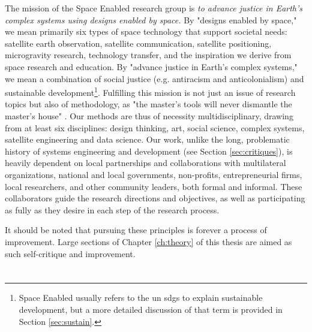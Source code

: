The mission of the Space Enabled research group is \textit{to advance justice in Earth's complex systems using designs enabled by space.} By "designs enabled by space," we mean primarily six types of space technology that support societal needs: satellite earth observation, satellite communication, satellite positioning, microgravity research, technology transfer, and the inspiration we derive from space research and education. By "advance justice in Earth's complex systems," we mean a combination of social justice (e.g. antiracism and anticolonialism) and sustainable development\footnote{Space Enabled usually refers to the \ac{un} \acp{sdg} to explain sustainable development, but a more detailed discussion of that term is provided in Section \ref{sec:sustain}.}. Fulfilling this mission is not just an issue of research topics but also of methodology, as "the master's tools will never dismantle the master's house" \cite{lordeMasterToolsWill1984}. Our methods are thus of necessity multidisciplinary, drawing from at least six disciplines: design thinking, art, social science, complex systems, satellite engineering and data science. Our work, unlike the long, problematic history of systems engineering and development (see Section \ref{sec:critiques}), is heavily dependent on local partnerships and collaborations with multilateral organizations, national and local governments, non-profits, entrepreneurial firms, local researchers, and other community leaders, both formal and informal. These collaborators guide the research directions and objectives, as well as participating as fully as they desire in each step of the research process.

It should be noted that pursuing these principles is forever a process of improvement. Large sections of Chapter \ref{ch:theory} of this thesis are aimed as such self-critique and improvement. 

\section{}


